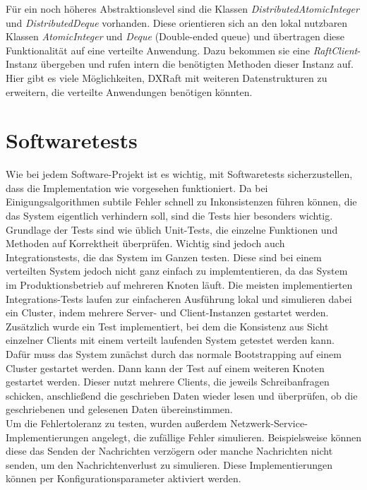 Für ein noch höheres Abstraktionslevel sind die Klassen \textit{DistributedAtomicInteger} und \textit{DistributedDeque} vorhanden. Diese orientieren sich an den lokal nutzbaren Klassen \textit{AtomicInteger} und \textit{Deque} (Double-ended queue) und übertragen diese Funktionalität auf eine verteilte Anwendung. Dazu bekommen sie eine \textit{RaftClient}-Instanz übergeben und rufen intern die benötigten Methoden dieser Instanz auf. Hier gibt es viele Möglichkeiten, DXRaft mit weiteren Datenstrukturen zu erweitern, die verteilte Anwendungen benötigen könnten.

\section{Softwaretests}

Wie bei jedem Software-Projekt ist es wichtig, mit Softwaretests sicherzustellen, dass die Implementation wie vorgesehen funktioniert. Da bei Einigungsalgorithmen subtile Fehler schnell zu Inkonsistenzen führen können, die das System eigentlich verhindern soll, sind die Tests hier besonders wichtig. Grundlage der Tests sind wie üblich Unit-Tests, die einzelne Funktionen und Methoden auf Korrektheit überprüfen. Wichtig sind jedoch auch Integrationstests, die das System im Ganzen testen. Diese sind bei einem verteilten System jedoch nicht ganz einfach zu implemtentieren, da das System im Produktionsbetrieb auf mehreren Knoten läuft. Die meisten implementierten Integrations-Tests laufen zur einfacheren Ausführung lokal und simulieren dabei ein Cluster, indem mehrere Server- und Client-Instanzen gestartet werden. \\
 Zusätzlich wurde ein Test implementiert, bei dem die Konsistenz aus Sicht einzelner Clients mit einem verteilt laufenden System getestet werden kann. Dafür muss das System zunächst durch das normale Bootstrapping auf einem Cluster gestartet werden. Dann kann der Test auf einem weiteren Knoten gestartet werden. Dieser nutzt mehrere Clients, die jeweils Schreibanfragen schicken, anschließend die geschrieben Daten wieder lesen und überprüfen, ob die geschriebenen und gelesenen Daten übereinstimmen. \\
 Um die Fehlertoleranz zu testen, wurden außerdem Netzwerk-Service-Implementierungen angelegt, die zufällige Fehler simulieren. Beispielsweise können diese das Senden der Nachrichten verzögern oder manche Nachrichten nicht senden, um den Nachrichtenverlust zu simulieren. Diese Implementierungen können per Konfigurationsparameter aktiviert werden. \\
